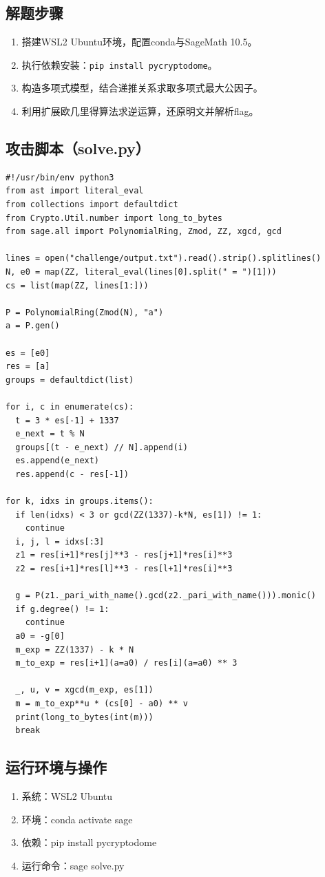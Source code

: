 \documentclass[12pt,a4paper,UTF8]{ctexart}
\begin{document}
\subsection{解题步骤}
\begin{enumerate}[itemsep=3pt, parsep=0pt]
    \item 搭建WSL2 Ubuntu环境，配置conda与SageMath 10.5。
    \item 执行依赖安装：\texttt{pip install pycryptodome}。
    \item 构造多项式模型，结合递推关系求取多项式最大公因子。
    \item 利用扩展欧几里得算法求逆运算，还原明文并解析flag。
\end{enumerate}

\subsection{攻击脚本（solve.py）}
\begin{lstlisting}
#!/usr/bin/env python3
from ast import literal_eval
from collections import defaultdict
from Crypto.Util.number import long_to_bytes
from sage.all import PolynomialRing, Zmod, ZZ, xgcd, gcd

lines = open("challenge/output.txt").read().strip().splitlines()
N, e0 = map(ZZ, literal_eval(lines[0].split(" = ")[1]))
cs = list(map(ZZ, lines[1:]))

P = PolynomialRing(Zmod(N), "a")
a = P.gen()

es = [e0]
res = [a]
groups = defaultdict(list)

for i, c in enumerate(cs):
  t = 3 * es[-1] + 1337
  e_next = t % N
  groups[(t - e_next) // N].append(i)
  es.append(e_next)
  res.append(c - res[-1])

for k, idxs in groups.items():
  if len(idxs) < 3 or gcd(ZZ(1337)-k*N, es[1]) != 1:
    continue
  i, j, l = idxs[:3]
  z1 = res[i+1]*res[j]**3 - res[j+1]*res[i]**3
  z2 = res[i+1]*res[l]**3 - res[l+1]*res[i]**3

  g = P(z1._pari_with_name().gcd(z2._pari_with_name())).monic()
  if g.degree() != 1:
    continue
  a0 = -g[0]
  m_exp = ZZ(1337) - k * N
  m_to_exp = res[i+1](a=a0) / res[i](a=a0) ** 3

  _, u, v = xgcd(m_exp, es[1])
  m = m_to_exp**u * (cs[0] - a0) ** v
  print(long_to_bytes(int(m)))
  break
\end{lstlisting}

\subsection{运行环境与操作}
\begin{enumerate}[itemsep=3pt, parsep=0pt]
    \item 系统：WSL2 Ubuntu
    \item 环境：conda activate sage
    \item 依赖：pip install pycryptodome
    \item 运行命令：sage solve.py
\end{enumerate}
\end{document}
